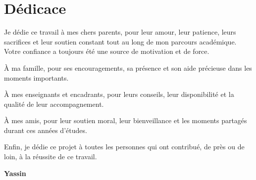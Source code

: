 \chapter*{Dédicace}

Je dédie ce travail à mes chers parents, pour leur amour, leur patience, leurs sacrifices et leur soutien constant tout au long de mon parcours académique. Votre confiance a toujours été une source de motivation et de force.

À ma famille, pour ses encouragements, sa présence et son aide précieuse dans les moments importants.

À mes enseignants et encadrants, pour leurs conseils, leur disponibilité et la qualité de leur accompagnement.

À mes amis, pour leur soutien moral, leur bienveillance et les moments partagés durant ces années d'études.

Enfin, je dédie ce projet à toutes les personnes qui ont contribué, de près ou de loin, à la réussite de ce travail.

\begin{flushright}
\textbf{Yassin}
\end{flushright}
